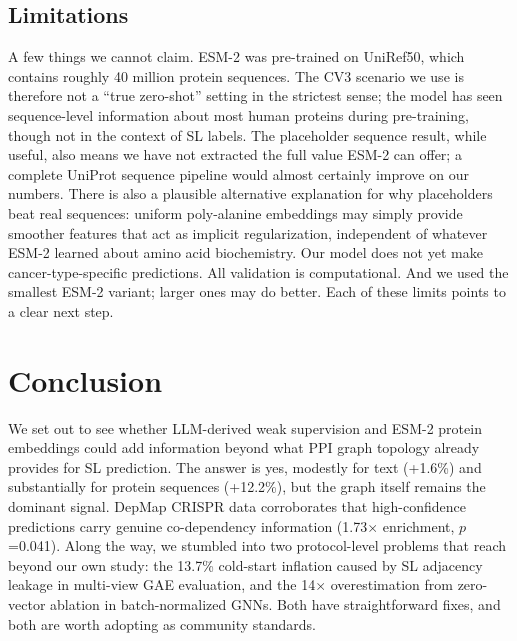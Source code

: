 \documentclass[12pt,a4paper]{article}
\begin{document}
\subsection{Limitations}

A few things we cannot claim. ESM-2 was pre-trained on UniRef50, which contains roughly 40 million protein sequences. The CV3 scenario we use is therefore not a ``true zero-shot'' setting in the strictest sense; the model has seen sequence-level information about most human proteins during pre-training, though not in the context of SL labels. The placeholder sequence result, while useful, also means we have not extracted the full value ESM-2 can offer; a complete UniProt sequence pipeline would almost certainly improve on our numbers. There is also a plausible alternative explanation for why placeholders beat real sequences: uniform poly-alanine embeddings may simply provide smoother features that act as implicit regularization, independent of whatever ESM-2 learned about amino acid biochemistry. Our model does not yet make cancer-type-specific predictions. All validation is computational. And we used the smallest ESM-2 variant; larger ones may do better. Each of these limits points to a clear next step.

\section{Conclusion}

We set out to see whether LLM-derived weak supervision and ESM-2 protein embeddings could add information beyond what PPI graph topology already provides for SL prediction. The answer is yes, modestly for text (+1.6\%) and substantially for protein sequences (+12.2\%), but the graph itself remains the dominant signal. DepMap CRISPR data corroborates that high-confidence predictions carry genuine co-dependency information (1.73$\times$ enrichment, $p$=0.041). Along the way, we stumbled into two protocol-level problems that reach beyond our own study: the 13.7\% cold-start inflation caused by SL adjacency leakage in multi-view GAE evaluation, and the 14$\times$ overestimation from zero-vector ablation in batch-normalized GNNs. Both have straightforward fixes, and both are worth adopting as community standards.
\end{document}
